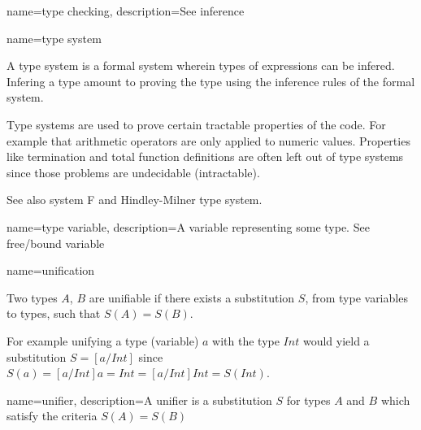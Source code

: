{ name={type checking},
  description={See inference}
}

{ name={type system} }
{A type system is a formal system wherein types of expressions can be infered. Infering a type amount to proving the type using the inference rules of the formal system.

Type systems are used to prove certain tractable properties of the code. For example that arithmetic operators are only applied to numeric values. Properties like termination and total function definitions are often left out of type systems since those problems are undecidable (intractable).

See also system F and Hindley-Milner type system.
}

{ name={type variable},
  description={A variable representing some type. See free/bound variable}
}

{ name={unification} }
{Two types $A$, $B$ are unifiable if there exists a substitution $S$, from type variables to types, such that $S(A) = S(B)$.

For example unifying a type (variable) $a$ with the type $Int$ would yield a substitution $S = [a/Int]$ since $S(a) = [a/Int]a = Int = [a/Int]Int = S(Int)$.
}

{ name={unifier},
  description={A unifier is a substitution $S$ for types $A$ and $B$ which satisfy the criteria $S(A) = S(B)$}
}


